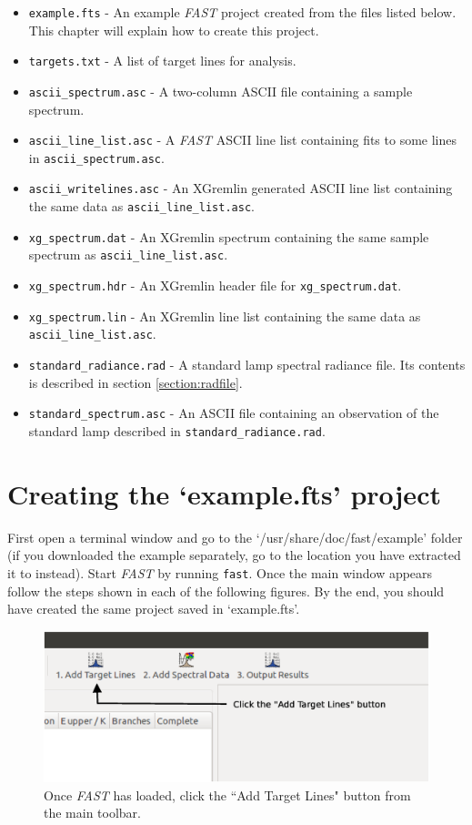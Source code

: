 \documentclass[a4paper,12pt]{report}
\newcommand{\fast}{\emph{FAST} }
\begin{document}
\begin{itemize}
\item \verb|example.fts| - An example \fast project created from the files listed below. This chapter will explain how to create this project.
\item \verb|targets.txt| - A list of target lines for analysis.
\item \verb|ascii_spectrum.asc| - A two-column ASCII file containing a sample spectrum.
\item \verb|ascii_line_list.asc| - A \fast ASCII line list containing fits to some lines in \verb|ascii_spectrum.asc|.
\item \verb|ascii_writelines.asc| - An XGremlin generated ASCII line list containing the same data as \verb|ascii_line_list.asc|.
\item \verb|xg_spectrum.dat| - An XGremlin spectrum containing the same sample spectrum as \verb|ascii_line_list.asc|.
\item \verb|xg_spectrum.hdr| - An XGremlin header file for \verb|xg_spectrum.dat|.
\item \verb|xg_spectrum.lin| - An XGremlin line list containing the same data as \verb|ascii_line_list.asc|.
\item \verb|standard_radiance.rad| - A standard lamp spectral radiance file. Its contents is described in section \ref{section:radfile}.
\item \verb|standard_spectrum.asc| - An ASCII file containing an observation of the standard lamp described in \verb|standard_radiance.rad|.
\end{itemize}

\section{Creating the `example.fts' project}

First open a terminal window and go to the `/usr/share/doc/fast/example' folder (if you downloaded the example separately, go to the location you have extracted it to instead). Start \fast by running \verb|fast|. Once the main window appears follow the steps shown in each of the following figures. By the end, you should have created the same project saved in `example.fts'.
\newpage
\begin{figure}\centering
\includegraphics[scale=0.37]{Tutorial1.eps}
\caption{Once \fast has loaded, click the ``Add Target Lines" button from the main toolbar.}
\label{fig:tut1}
\end{figure}
\end{document}
